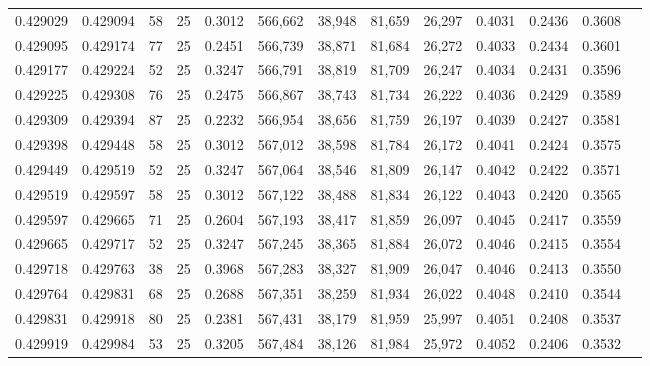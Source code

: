 \begin{tabular}{rrrrrrrrrrrrr}
0.429029 & 0.429094 &    58 &  25 &                                     0.3012 & 566,662 &  38,948 &  81,659 &  26,297 & 0.4031 & 0.2436 & 0.3608 \\
0.429095 & 0.429174 &    77 &  25 &                                     0.2451 & 566,739 &  38,871 &  81,684 &  26,272 & 0.4033 & 0.2434 & 0.3601 \\
0.429177 & 0.429224 &    52 &  25 &                                     0.3247 & 566,791 &  38,819 &  81,709 &  26,247 & 0.4034 & 0.2431 & 0.3596 \\
0.429225 & 0.429308 &    76 &  25 &                                     0.2475 & 566,867 &  38,743 &  81,734 &  26,222 & 0.4036 & 0.2429 & 0.3589 \\
0.429309 & 0.429394 &    87 &  25 &                                     0.2232 & 566,954 &  38,656 &  81,759 &  26,197 & 0.4039 & 0.2427 & 0.3581 \\
0.429398 & 0.429448 &    58 &  25 &                                     0.3012 & 567,012 &  38,598 &  81,784 &  26,172 & 0.4041 & 0.2424 & 0.3575 \\
0.429449 & 0.429519 &    52 &  25 &                                     0.3247 & 567,064 &  38,546 &  81,809 &  26,147 & 0.4042 & 0.2422 & 0.3571 \\
0.429519 & 0.429597 &    58 &  25 &                                     0.3012 & 567,122 &  38,488 &  81,834 &  26,122 & 0.4043 & 0.2420 & 0.3565 \\
0.429597 & 0.429665 &    71 &  25 &                                     0.2604 & 567,193 &  38,417 &  81,859 &  26,097 & 0.4045 & 0.2417 & 0.3559 \\
0.429665 & 0.429717 &    52 &  25 &                                     0.3247 & 567,245 &  38,365 &  81,884 &  26,072 & 0.4046 & 0.2415 & 0.3554 \\
0.429718 & 0.429763 &    38 &  25 &                                     0.3968 & 567,283 &  38,327 &  81,909 &  26,047 & 0.4046 & 0.2413 & 0.3550 \\
0.429764 & 0.429831 &    68 &  25 &                                     0.2688 & 567,351 &  38,259 &  81,934 &  26,022 & 0.4048 & 0.2410 & 0.3544 \\
0.429831 & 0.429918 &    80 &  25 &                                     0.2381 & 567,431 &  38,179 &  81,959 &  25,997 & 0.4051 & 0.2408 & 0.3537 \\
0.429919 & 0.429984 &    53 &  25 &                                     0.3205 & 567,484 &  38,126 &  81,984 &  25,972 & 0.4052 & 0.2406 & 0.3532 \\

\end{tabular}
